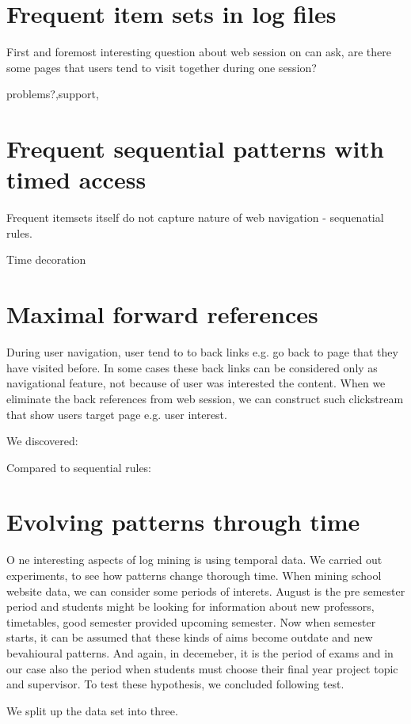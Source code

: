 \documentclass[english,a4paper]{article}
\begin{document}
\section{Frequent item sets in log files} 
First and foremost interesting question about web session on can ask, are there some pages that users tend to visit together during one session?



problems?,support,


\section{Frequent sequential patterns with timed access}
Frequent itemsets itself do not capture nature of web navigation - sequenatial rules. 

Time decoration

\section{Maximal forward references}
During user navigation, user tend to to back links e.g. go back to page that they have visited before. In some cases these back links can be considered only as navigational feature, not because of user was interested the content.  When we eliminate the back references from web session, we can construct such clickstream that show users target page e.g. user interest.

We discovered:

Compared to sequential rules:


\section{Evolving patterns through time} O
ne interesting aspects of log mining is using temporal data. We carried out experiments, to see how patterns change thorough time. When mining school website data, we can consider some periods of interets. August is the pre semester period and students might be looking for information about new professors, timetables, good semester provided upcoming semester. Now when semester starts, it can be assumed that these kinds of aims become outdate and new bevahioural patterns. And again, in decemeber, it is the period of exams and in our case also the period when students must choose their final year project topic and supervisor. To test these hypothesis, we concluded following test. 

We split up the data set into three.
\end{document}
